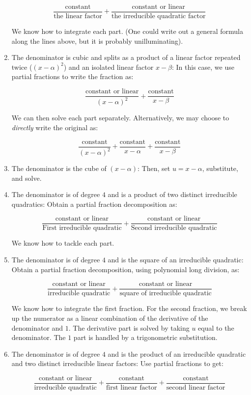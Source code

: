 \documentclass[10pt]{amsart}
\begin{document}
\begin{enumerate}
  $$\frac{\text{constant}}{\text{the linear factor}} + \frac{\text{constant or linear}}{\text{the irreducible quadratic factor}}$$

  We know how to integrate each part. (One could write out a general
  formula along the lines above, but it is probably unilluminating).
\item The denominator is cubic and splits as a product of a linear
  factor repeated twice ($(x - \alpha)^2$) and an isolated linear
  factor $x - \beta$: In this case, we use partial fractions to write
  the fraction as:

  $$\frac{\text{constant or linear}}{(x - \alpha)^2} + \frac{\text{constant}}{x - \beta}$$

  We can then solve each part separately. Alternatively, we may choose
  to {\em directly} write the original as:

  $$\frac{\text{constant}}{(x - \alpha)^2} + \frac{\text{constant}}{x - \alpha} + \frac{\text{constant}}{x - \beta}$$

\item The denominator is the cube of $(x - \alpha)$: Then, set $u = x
  - \alpha$, substitute, and solve.
\item The denominator is of degree $4$ and is a product of two
  distinct irreducible quadratics: Obtain a partial fraction
  decomposition as:

  $$\frac{\text{constant or linear}}{\text{First irreducible quadratic}} + \frac{\text{constant or linear}}{\text{Second irreducible quadratic}}$$

  We know how to tackle each part.
\item The denominator is of degree $4$ and is the square of an
  irreducible quadratic: Obtain a partial fraction decomposition,
  using polynomial long division, as:

  $$\frac{\text{constant or linear}}{\text{irreducible quadratic}} + \frac{\text{constant or linear}}{\text{square of irreducible quadratic}}$$

  We know how to integrate the first fraction. For the second
  fraction, we break up the numerator as a linear combination of the
  derivative of the denominator and $1$. The derivative part is solved
  by taking $u$ equal to the denominator. The $1$ part is handled by a
  trigonometric substitution.
\item The denominator is of degree $4$ and is the product of an
  irreducible quadratic and two distinct irreducible linear factors:
  Use partial fractions to get:

  $$\frac{\text{constant or linear}}{\text{irreducible quadratic}} + \frac{\text{constant}}{\text{first linear factor}} + \frac{\text{constant}}{\text{second linear factor}}$$
\end{enumerate}
\end{document}
